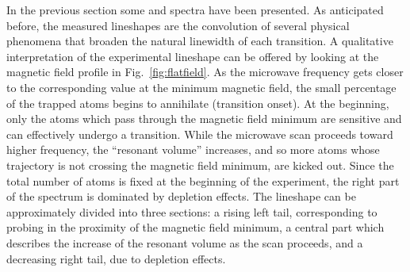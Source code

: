 In the previous section some \fcb and \fda spectra have been presented. As anticipated before, the measured lineshapes are the convolution of several physical phenomena that broaden the natural linewidth of each transition. A qualitative interpretation of the experimental lineshape can be offered by looking at the magnetic field profile in Fig.~\ref{fig:flatfield}. As the microwave frequency gets closer to the corresponding value at the minimum magnetic field, the small percentage of the trapped atoms begins to annihilate (transition onset). At the beginning, only the atoms which pass through the magnetic field minimum are sensitive and can effectively undergo a transition. While the microwave scan proceeds toward higher frequency, the ``resonant volume'' increases, and so more atoms whose trajectory is not crossing the magnetic field minimum, are kicked out. Since the total number of atoms is fixed at the beginning of the experiment, the right part of the spectrum is dominated by depletion effects. The lineshape can be approximately divided into three sections: a rising left tail, corresponding to probing in the proximity of the magnetic field minimum, a central part which describes the increase of the resonant volume as the scan proceeds, and a decreasing right tail, due to depletion effects.

